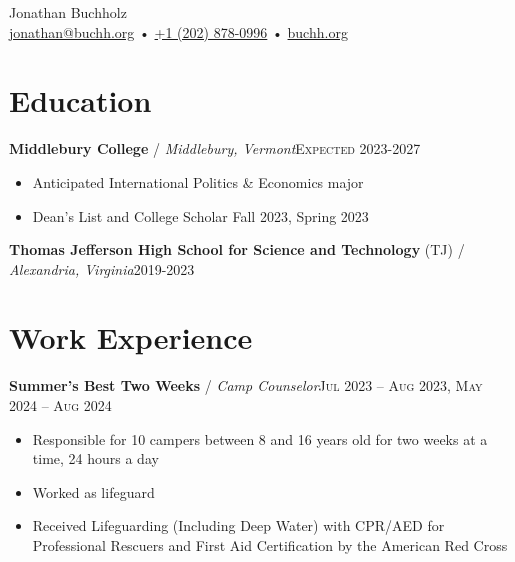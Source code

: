 \documentclass[12pt, a4paper]{article}
\begin{document}
{\LARGE Jonathan Buchholz}\\
\href{mailto:jonathan@buchh.org}{jonathan@buchh.org} • \href{tel:2028780996}{+1 (202) 878-0996} • \href{https://buchh.org}{buchh.org}\\

\vspace{-8mm}
\section*{Education}
\textbf{Middlebury College} / \textit{Middlebury, Vermont}\hfill\textsc{Expected 2023-2027}\\
\begin{itemize}
    \vspace{-8mm}
    \item Anticipated International Politics \& Economics major
    \item Dean's List and College Scholar Fall 2023, Spring 2023
\end{itemize}
\textbf{Thomas Jefferson High School for Science and Technology} (TJ) / \textit{Alexandria, Virginia}\hfill\textsc{2019-2023}\\
\vspace{-4mm}

\vspace{-6mm}
\section*{Work Experience}
\vspace{-2mm}

\textbf{Summer's Best Two Weeks} / \textit{Camp Counselor}\hfill\textsc{Jul 2023 -- Aug 2023, May 2024 -- Aug 2024}\\
\begin{itemize}
    \vspace{-8mm}
    \item Responsible for 10 campers between 8 and 16 years old for two weeks at a time, 24 hours a day
    \item Worked as lifeguard
    \item Received Lifeguarding (Including Deep Water) with CPR/AED for Professional Rescuers and First Aid Certification by the American Red Cross
\end{itemize}
\end{document}
